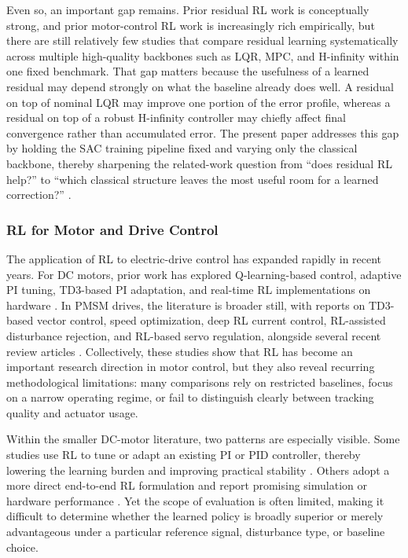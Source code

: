 \documentclass[conference]{IEEEtran}
\begin{document}
Even so, an important gap remains. Prior residual RL work is conceptually strong, and prior motor-control RL work is increasingly rich empirically, but there are still relatively few studies that compare residual learning systematically across multiple high-quality backbones such as LQR, MPC, and H-infinity within one fixed benchmark. That gap matters because the usefulness of a learned residual may depend strongly on what the baseline already does well. A residual on top of nominal LQR may improve one portion of the error profile, whereas a residual on top of a robust H-infinity controller may chiefly affect final convergence rather than accumulated error. The present paper addresses this gap by holding the SAC training pipeline fixed and varying only the classical backbone, thereby sharpening the related-work question from ``does residual RL help?'' to ``which classical structure leaves the most useful room for a learned correction?'' \cite{johannink2019,mayne2000,doyle1989,zhou1996}.

\subsubsection{RL for Motor and Drive Control}
The application of RL to electric-drive control has expanded rapidly in recent years. For DC motors, prior work has explored Q-learning-based control, adaptive PI tuning, TD3-based PI adaptation, and real-time RL implementations on hardware \cite{rl_dcmotor_dqn,adaptive_pi_dc_motor,tufenkci2023,poudel2022,anugula2021,qin2018}. In PMSM drives, the literature is broader still, with reports on TD3-based vector control, speed optimization, deep RL current control, RL-assisted disturbance rejection, and RL-based servo regulation, alongside several recent review articles \cite{yin2023td3pmsm,hu2025td3pmsm,schindler2023iemdc,wang2023tec,wang2023tpe,zhao2023pmsm,wfhu2023multiscenario,dukkipati2026,review2025pmsm}. Collectively, these studies show that RL has become an important research direction in motor control, but they also reveal recurring methodological limitations: many comparisons rely on restricted baselines, focus on a narrow operating regime, or fail to distinguish clearly between tracking quality and actuator usage.

Within the smaller DC-motor literature, two patterns are especially visible. Some studies use RL to tune or adapt an existing PI or PID controller, thereby lowering the learning burden and improving practical stability \cite{adaptive_pi_dc_motor,tufenkci2023,qin2018}. Others adopt a more direct end-to-end RL formulation and report promising simulation or hardware performance \cite{rl_dcmotor_dqn,poudel2022,anugula2021}. Yet the scope of evaluation is often limited, making it difficult to determine whether the learned policy is broadly superior or merely advantageous under a particular reference signal, disturbance type, or baseline choice.
\end{document}
